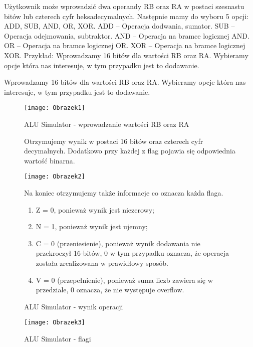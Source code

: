 \documentclass[12pt, a4paper, onside, polish]{article}				%
\begin{document}
Użytkownik może wprowadzić dwa operandy RB oraz RA w postaci szesnastu bitów lub czterech cyfr heksadecymalnych. Następnie mamy do wyboru 5 opcji: ADD, SUB, AND, OR, XOR.\newline\newline
ADD – Operacja dodwania, sumator.\newline
SUB – Operacja odejmowania, subtraktor.\newline
AND – Operacja na bramce logicznej AND.\newline
OR – Operacja na bramce logicznej OR.\newline
XOR – Operacja na bramce logicznej XOR. \newline\newline
\setlength{\parindent}{0cm}
Przykład:  \newline
Wprowadzamy 16 bitów dla wartości RB oraz RA. Wybieramy opcje która nas interesuje, w tym przypadku jest to dodawanie.
\begin{enumerate}
\item Wprowadzamy 16 bitów dla wartości RB oraz RA. Wybieramy opcje która nas interesuje, w tym przypadku jest to dodawanie.
 \begin{figure}[hbt!]
{\centering \texttt{[image: Obrazek1]} \caption{ALU Simulator - wprowadzanie wartości RB oraz RA}}\vspace{5mm}
\item Otrzymujemy wynik w postaci 16 bitów oraz czterech cyfr decymalnych. Dodatkowo przy każdej z flag pojawia się odpowiednia wartość binarna. 
{\centering \texttt{[image: Obrazek2]} \caption{ALU Simulator - wynik operacji}}\vspace{5mm}
\item Na koniec otrzymujemy także informacje co oznacza każda flaga.
 \begin{enumerate}
    \item Z = 0, ponieważ wynik jest niezerowy;
    \item N = 1, ponieważ wynik jest ujemny;
    \item C = 0 (przeniesienie), ponieważ wynik dodawania nie przekroczył 16-bitów, 0 w tym przypadku oznacza, że operacja została zrealizowana w prawidłowy sposób.
    \item V = 0 (przepełnienie), ponieważ suma liczb zawiera się w przedziale, 0 oznacza, że nie występuje overflow.
\end{enumerate}
\end{figure}
 \begin{figure}[hbt!]
{\centering \texttt{[image: Obrazek3]} \caption{ALU Simulator - flagi}}\vspace{5mm}
\end{figure}
\end{enumerate}
\end{document}
